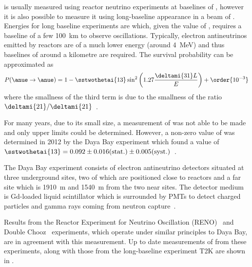  is usually measured using reactor neutrino experiments at baselines of , however it is also possible to measure it using long-baseline \nue appearance in a beam of \numu.
Energies for long baseline experiments are  which, given the value of , requires a baseline of a few \SI{100}{\kilo\metre} to observe oscillations.
Typically, electron antineutrinos emitted by reactors are of a much lower energy (around \SI{4}{\mega\electronvolt}) and thus baselines of around a kilometre are required.
The \anue survival probability can be approximated as 
\begin{equation}
  P(\anue \rightarrow \anue) = 1 - \sstwothetai{13}\sin^{2}\left( 1.27 \frac{\deltami{31}L}{E} \right) + \order{10^{-3}}
\end{equation}
where the smallness of the third term is due to the smallness of the ratio $\deltami{21}/\deltami{21}$~\cite{kuze2013measurements}.

For many years, due to its small size, a measurement of  was not able to be made and only upper limits could be determined.
However, a non-zero value of  was determined in 2012 by the Daya Bay experiment which found a value of $\sstwothetai{13} = 0.092\pm0.016(\text{stat.})\pm0.005(\text{syst.})$~\cite{dayaBay}.

The Daya Bay experiment consists of electron antineutrino detectors situated at three underground sites, two of which are positioned close to reactors and a far site which is \SI{1910}{\metre} and \SI{1540}{\metre} from the two near sites.
The detector medium is Gd-loaded liquid scintillator which is surrounded by PMTs to detect charged particles and gamma rays coming from neutron capture~\cite{dayaBayDetector}.

Results from the Reactor Experiment for Neutrino Oscillation (RENO)~\cite{reno} and Double Chooz~\cite{doubleChooz} experiments, which operate under similar principles to Daya Bay, are in agreement with this measurement.
Up to date measurements of  from these experiments, along with those from the long-baseline experiment T2K are shown in .

